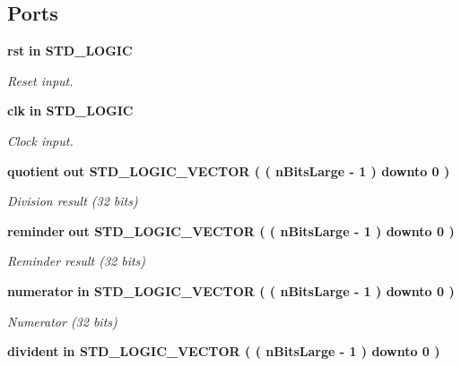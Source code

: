 \subsection*{Ports}
 \begin{DoxyCompactItemize}
\item 
{\bf rst}  {\bfseries {\bfseries in }} {\bfseries S\-T\-D\-\_\-\-L\-O\-G\-I\-C } \label{classdivisor_a0ddd7f10f240eabbaa5f593dc724676d}

\begin{DoxyCompactList}\small\item\em Reset input. \end{DoxyCompactList}\item 
{\bf clk}  {\bfseries {\bfseries in }} {\bfseries S\-T\-D\-\_\-\-L\-O\-G\-I\-C } \label{classdivisor_afccc0679a700cd9acf53b87c41fee67a}

\begin{DoxyCompactList}\small\item\em Clock input. \end{DoxyCompactList}\item 
{\bf quotient}  {\bfseries {\bfseries out }} {\bfseries S\-T\-D\-\_\-\-L\-O\-G\-I\-C\-\_\-\-V\-E\-C\-T\-O\-R (  ( n\-Bits\-Large -\/   1  )    downto    0  ) } \label{classdivisor_a72b864bee7e5df9aaa6663e15717ee2a}

\begin{DoxyCompactList}\small\item\em Division result (32 bits) \end{DoxyCompactList}\item 
{\bf reminder}  {\bfseries {\bfseries out }} {\bfseries S\-T\-D\-\_\-\-L\-O\-G\-I\-C\-\_\-\-V\-E\-C\-T\-O\-R (  ( n\-Bits\-Large -\/   1  )    downto    0  ) } \label{classdivisor_a2e2b27233f56bb5217044913043942fa}

\begin{DoxyCompactList}\small\item\em Reminder result (32 bits) \end{DoxyCompactList}\item 
{\bf numerator}  {\bfseries {\bfseries in }} {\bfseries S\-T\-D\-\_\-\-L\-O\-G\-I\-C\-\_\-\-V\-E\-C\-T\-O\-R (  ( n\-Bits\-Large -\/   1  )    downto    0  ) } \label{classdivisor_ad29d3fb6c6ea697db492c43d4a3630eb}

\begin{DoxyCompactList}\small\item\em Numerator (32 bits) \end{DoxyCompactList}\item 
{\bf divident}  {\bfseries {\bfseries in }} {\bfseries S\-T\-D\-\_\-\-L\-O\-G\-I\-C\-\_\-\-V\-E\-C\-T\-O\-R (  ( n\-Bits\-Large -\/   1  )    downto    0  ) } \label{classdivisor_a125151d21c7a62bc99907ddc72a7ebb1}


\end{DoxyCompactItemize}
